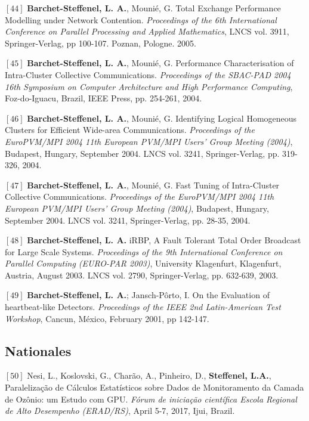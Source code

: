 \documentclass[final,twoside]{hdr} %
\begin{document}
\vspace{1em} \noindent $[44]$
\textbf{Barchet-Steffenel, L. A.}, Mounié, G. {Total Exchange Performance Modelling under Network Contention}. {\em Proceedings of the 6th International Conference on Parallel Processing and Applied Mathematics}, LNCS vol. 3911, Springer-Verlag, pp 100-107. Poznan, Pologne. 2005. 

\vspace{1em} \noindent $[45]$
\textbf{Barchet-Steffenel, L. A.}, Mounié, G. {Performance Characterisation of Intra-Cluster Collective Communications}. {\em Proceedings of the SBAC-PAD 2004 16th Symposium on Computer Architecture and High Performance Computing}, Foz-do-Iguacu, Brazil, IEEE Press, pp. 254-261, 2004. 

\vspace{1em} \noindent $[46]$
\textbf{Barchet-Steffenel, L. A.}, Mounié, G. {Identifying Logical Homogeneous Clusters for Efficient Wide-area Communications}. {\em Proceedings of the EuroPVM/MPI 2004 11th European PVM/MPI Users' Group Meeting (2004)}, Budapest, Hungary, September 2004. LNCS vol. 3241, Springer-Verlag, pp. 319-326, 2004. 

\vspace{1em} \noindent $[47]$
\textbf{Barchet-Steffenel, L. A.}, Mounié, G. {Fast Tuning of Intra-Cluster Collective Communications}. {\em Proceedings of the EuroPVM/MPI 2004 11th European PVM/MPI Users' Group Meeting (2004)}, Budapest, Hungary, September 2004. LNCS vol. 3241, Springer-Verlag, pp. 28-35, 2004. 

\vspace{1em} \noindent $[48]$
\textbf{Barchet-Steffenel, L. A.} {iRBP, A Fault Tolerant Total Order Broadcast for Large Scale Systems}. {\em Proceedings of the 9th International Conference on Parallel Computing (EURO-PAR 2003)}, University Klagenfurt, Klagenfurt, Austria, August 2003. LNCS vol. 2790, Springer-Verlag, pp. 632-639, 2003. 

\vspace{1em} \noindent $[49]$
\textbf{Barchet-Steffenel, L. A.}; Jansch-Pôrto, I. {On the Evaluation of heartbeat-like Detectors}. {\em Proceedings of the IEEE 2nd Latin-American Test Workshop}, Cancun, México, February 2001, pp 142-147. 


\subsection*{Nationales}

\noindent $[50]$
Nesi, L., Koslovski, G., Charão, A., Pinheiro, D., \textbf{Steffenel, L.A.}, {Paralelização de Cálculos Estatísticos sobre Dados de Monitoramento da Camada de Ozônio: um Estudo com GPU}. {\em Fórum de iniciação científica Escola Regional de Alto Desempenho (ERAD/RS)}, April 5-7, 2017, Ijui, Brazil.
\end{document}
